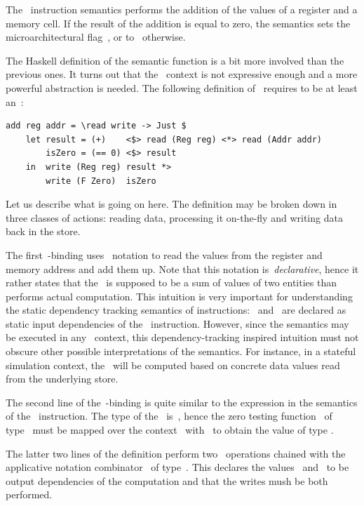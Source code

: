 The~ instruction semantics performs the addition of the values of
a register and a memory cell. If the result of the addition is equal to zero,
the semantics sets the~ microarchitectural flag~, or to~ otherwise.

The Haskell definition of the semantic function is a bit more involved than the previous
ones. It turns out that the~ context is not expressive enough and a
more powerful abstraction is needed. The following definition of~ requires
 to be at least an~:

\begin{verbatim}
add reg addr = \read write -> Just $
    let result = (+)    <$> read (Reg reg) <*> read (Addr addr)
        isZero = (== 0) <$> result
    in  write (Reg reg) result *>
        write (F Zero)  isZero
\end{verbatim}

Let us describe what is going on here. The definition may be broken down in three
classes of actions: reading data, processing it on-the-fly and writing data back in the store.

The first~-binding uses~ notation
to read the values from the register and memory address and add them up. Note that
this notation is~\emph{declarative}, hence it rather states that the~
is supposed to be a sum of values of two entities than performs actual computation.
This intuition is very important for understanding the static dependency tracking semantics
of instructions:~ and~ are declared as static input dependencies of
the~ instruction. However, since the semantics may be executed in any~ context,
this dependency-tracking inspired intuition must not
obscure other possible interpretations of the semantics. For instance, in a stateful
simulation context, the~ will be computed based on concrete data values
read from the underlying store.

The second line of the~-binding is quite similar to the expression in the
semantics of the~ instruction. The type of the~ is~,
hence the zero testing function~ of type~
must be mapped over the context~ with~\hs{<$>} to obtain the value of type
.

The latter two lines of the definition perform two~ operations chained with
the applicative notation combinator~\hs{*>} of type~.
This declares the values~ and~ to be output dependencies of
the computation and that the writes mush be both performed.

